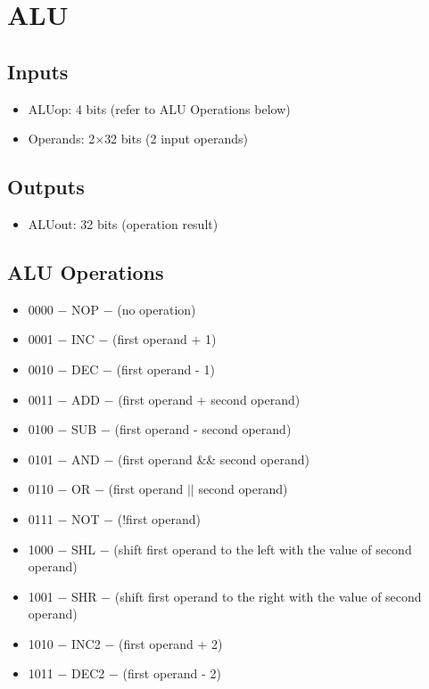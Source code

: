 \section{ALU}

\subsection{Inputs}
\begin{itemize}
    \item ALUop: 4 bits (refer to ALU Operations below)
    \item Operands: 2$\times$32 bits (2 input operands)
\end{itemize}

\subsection{Outputs}
\begin{itemize}
    \item ALUout: 32 bits (operation result)
\end{itemize}

\subsection{ALU Operations}
\begin{itemize}
    \item 0000 $-$ NOP $-$ (no operation)
    \item 0001 $-$ INC $-$ (first operand + 1)
    \item 0010 $-$ DEC $-$ (first operand - 1)
    \item 0011 $-$ ADD $-$ (first operand + second operand)
    \item 0100 $-$ SUB $-$ (first operand - second operand)
    \item 0101 $-$ AND $-$ (first operand \&\& second operand)
    \item 0110 $-$ OR $-$ (first operand $||$ second operand)
    \item 0111 $-$ NOT $-$ (!first operand)
    \item 1000 $-$ SHL $-$ (shift first operand to the left with the value of second operand)
    \item 1001 $-$ SHR $-$ (shift first operand to the right with the value of second operand)
    \item 1010 $-$ INC2 $-$ (first operand + 2)
    \item 1011 $-$ DEC2 $-$ (first operand - 2)
\end{itemize}

